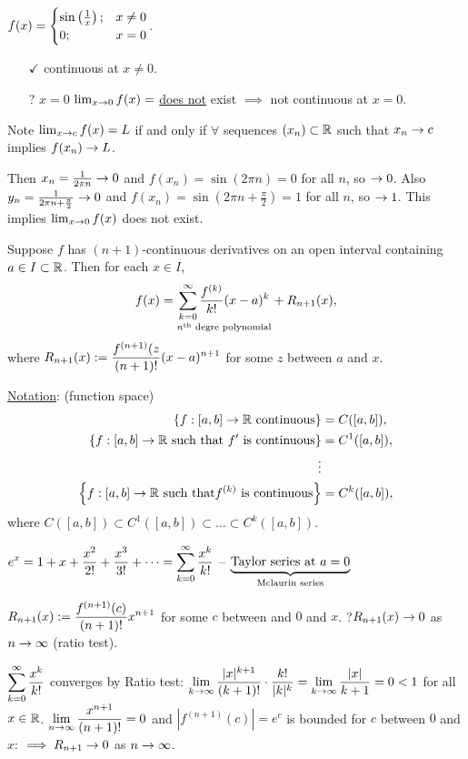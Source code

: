 \documentclass[]{article}
\begin{document}
\begin{example}
	$f(x) = \begin{cases} \sin\plr{\frac1x}; & x\neq 0 \\ 0; & x=0 \end{cases}$.
	\begin{itemize}
		\item[$\checkmark$] continuous at $x\neq 0$. 	
		\item[?] $x=0$ $\lim_{x\ra0} f(x) = $ \ul{does not} exist $\implies$ not continuous at $x=0$.
	\end{itemize}
	Note $\lim_{x\ra c}f(x) = L$ if and only if $\forall$ sequences $(x_n)\subset\mb R$ such that $x_n\ra c$ implies $f(x_n)\ra L$.

	Then $x_n = \frac1{2\pi n}\ra 0$ and $f(x_n) =\sin(2\pi n) = 0$ for all $n$, so $\ra0$.
	Also $y_n = \frac1{2\pi n+\frac\pi2} \ra 0$ and $f(x_n) = \sin(2\pi n+\frac\pi2)=1$ for all $n$, so $\ra1$.
	This implies $\lim_{x\ra 0}f(x)$ does not exist.
\end{example}

\newpage

\begin{theorem}
	Suppose $f$ has $(n+1)$-continuous derivatives on an open interval containing $a\in I\subset\mb R$.
	Then for each $x\in I$,
	$$f(x) = \us{n^\text{th}\text{ degre polynomial}}{\sum_{k=0}^\infty \frac{f^{(k)}}{k!}(x-a)^k} + R_{n+1}(x),$$
	where $\ds R_{n+1}(x) := \frac{f^{(n+1)}(z}{(n+1)!}(x-a)^{n+1}$ for some $z$ between $a$ and $x$.
\end{theorem}
\ul{Notation}: (function space) 
\begin{align*} 
	\set{f:[a,b]\ra\mb R\text{ continuous}} &= C([a,b]), \\
	\set{f:[a,b]\ra\mb R\text{ such that }f'\text{ is continuous}} &= C^1([a,b]), \\
	\vdots \\
	\set{f:[a,b]\ra\mb R\text{ such that}f^{(k)}\text{ is continuous}} &= C^k([a,b]),
\end{align*}
where $C([a,b]) \subset C^1([a,b]) \subset \dots \subset C^k([a,b])$.

\begin{example}
	$\ds e^x = 1+x+\frac{x^2}{2!} + \frac{x^3}{3!} + \dots = \sum_{k=0}^\infty \frac{x^k}{k!}$ -- $\ub{\text{Mclaurin series}}{\text{Taylor series at }a=0}$

	$\ds R_{n+1}(x) := \frac{f^{(n+1)}(c)}{(n+1)!} x^{n+1}$ for some $c$ between and $0$ and $x$.
	?$R_{n+1}(x) \ra 0$ as $n\ra\infty$ (ratio test).

	$\ds\sum_{k=0}^\infty \frac{x^k}{k!}$ converges by Ratio test: $\ds\lim_{k\ra\infty} \frac{|x|^{k+1}}{(k+1)!} \cdot \frac{k!}{|k|^k} = \lim_{k\ra\infty} \frac{|x|}{k+1} = 0 < 1$ for all $x\in\mb R$.
	$\ds\lim_{n\ra\infty} \frac{x^{n+1}}{(n+1)!}=0$ and $|f^{(n+1)}(c)| = e^c$ is bounded for $c$ between $0$ and $x$: $\implies R_{n+1} \ra 0$ as $n\ra\infty$.
\end{example}
\end{document}
